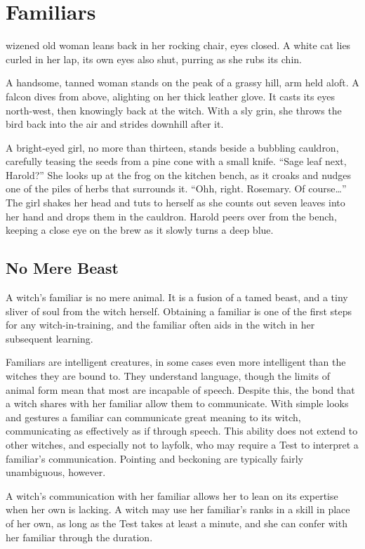 \chapter{Familiars}

 wizened old woman leans back in her rocking chair, eyes closed.
A white cat lies curled in her lap, its own eyes also shut, purring as she rubs its chin.

A handsome, tanned woman stands on the peak of a grassy hill, arm held aloft.
A falcon dives from above, alighting on her thick leather glove.
It casts its eyes north-west, then knowingly back at the witch.
With a sly grin, she throws the bird back into the air and strides downhill after it.

A bright-eyed girl, no more than thirteen, stands beside a bubbling cauldron, carefully teasing the seeds from a pine cone with a small knife.
``Sage leaf next, Harold?''
She looks up at the frog on the kitchen bench, as it croaks and nudges one of the piles of herbs that surrounds it.
``Ohh, right. Rosemary. Of course{\dots}''
The girl shakes her head and tuts to herself as she counts out seven leaves into her hand and drops them in the cauldron.
Harold peers over from the bench, keeping a close eye on the brew as it slowly turns a deep blue.

\section{No Mere Beast}

A witch's familiar is no mere animal.
It is a fusion of a tamed beast, and a tiny sliver of soul from the witch herself.
Obtaining a familiar is one of the first steps for any witch-in-training, and the familiar often aids in the witch in her subsequent learning.

Familiars are intelligent creatures, in some cases even more intelligent than the witches they are bound to.
They understand language, though the limits of animal form mean that most are incapable of speech.
Despite this, the bond that a witch shares with her familiar allow them to communicate.
With simple looks and gestures a familiar can communicate great meaning to its witch, communicating as effectively as if through speech.
This ability does not extend to other witches, and especially not to layfolk, who may require a Test to interpret a familiar's communication.
Pointing and beckoning are typically fairly unambiguous, however.

A witch's communication with her familiar allows her to lean on its expertise when her own is lacking.
A witch may use her familiar's ranks in a skill in place of her own, as long as the Test takes at least a minute, and she can confer with her familiar through the duration.

